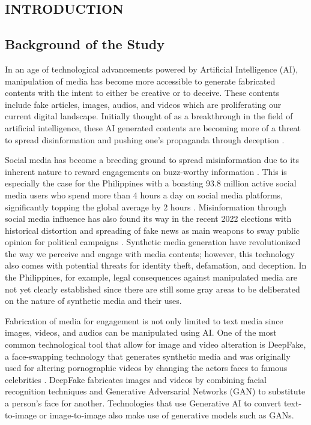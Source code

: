 \documentclass{icsthesis}
\begin{document}
\begin{mainmatter}
\section{INTRODUCTION}
\subsection{Background of the Study}
\par In an age of technological advancements powered by Artificial Intelligence (AI), manipulation of media has become more accessible to generate fabricated contents with the intent to either be creative or to deceive. These contents include fake articles, images, audios, and videos which are proliferating our current digital landscape. Initially thought of as a breakthrough in the field of artificial intelligence, these AI generated contents are becoming more of a threat to spread disinformation and pushing one's propaganda through deception \citep{forbes}.

\par Social media has become a breeding ground to spread misinformation due to its inherent nature to reward engagements on buzz-worthy information \citep{usc}. This is especially the case for the Philippines with a boasting 93.8 million active social media users who spend more than 4 hours a day on social media platforms, significantly topping the global average by 2 hours \citep{socmed-ph}. Misinformation through social media influence has also found its way in the recent 2022 elections with historical distortion and spreading of fake news as main weapons to sway public opinion for political campaigns \citep{campaign}. Synthetic media generation have revolutionized the way we perceive and engage with media contents; however, this technology also comes with potential threats for identity theft, defamation, and deception. In the Philippines, for example, legal consequences against manipulated media are not yet clearly established \citep{news-ph} since there are still some gray areas to be deliberated on the nature of synthetic media and their uses.

\par Fabrication of media for engagement is not only limited to text media since images, videos, and audios can be manipulated using AI. One of the most common technological tool that allow for image and video alteration is DeepFake, a face-swapping technology that generates synthetic media and was originally used for altering pornographic videos by changing the actors faces to famous celebrities \citep{history-deepfake}. DeepFake fabricates images and videos by combining facial recognition techniques and Generative Adversarial Networks (GAN) \citep{GAN} to substitute a person's face for another. Technologies that use Generative AI to convert text-to-image or image-to-image also make use of generative models such as GANs. 


\end{mainmatter}
\end{document}
